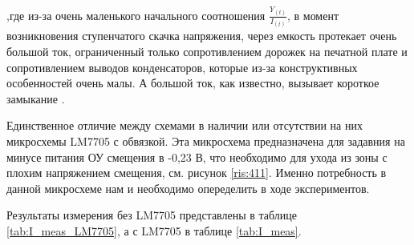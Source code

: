,где из-за очень маленького начального соотношения $\frac{Y_{(t)}}{I_{(t)}}$, в момент возникновения ступенчатого
скачка напряжения, через емкость протекает очень большой ток, ограниченный только сопротивлением
дорожек на печатной плате и сопротивлением выводов конденсаторов, которые из-за конструктивных особенностей очень
малы. А большой ток, как известно, вызывает короткое замыкание \cite{Howard J: Start Black Magic}.

Единственное отличие между схемами в наличии или отсутствии на них микросхемы LM7705 с обвязкой. Эта микросхема
предназначена для задавния на минусе питания ОУ смещения в -0,23 В, что необходимо для ухода из зоны с плохим 
напряжением смещения, см. рисунок \ref{ris:411}. Именно потребность в данной микросхеме нам и необходимо опеределить
в ходе экспериментов.

Результаты измерения без LM7705 представлены в таблице \ref{tab:I_meas_LM7705}, а с LM7705 в таблице \ref{tab:I_meas}.


